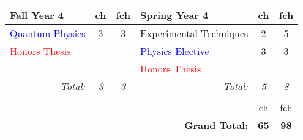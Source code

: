 \documentclass[12pt,preprint]{aastex}
\newcommand{\red}[1]{\textcolor{red}{#1}}
\newcommand{\blue}[1]{\textcolor{blue}{#1}}
\begin{document}
\begin{longtable}{lcclcc}
\hline
{\bf Fall Year 4} & {\sc ch} & {\sc fch} & {\bf Spring Year 4} & {\sc ch} & {\sc fch} \\ 
\hline
\hline
\blue{Quantum Physics} & 3 & 3 & Experimental Techniques  & 2 & 5 \\
\red{Honors Thesis}    &   &   & \blue{Physics Elective}  & 3 & 3 \\
                       &   &   & \red{Honors Thesis}  &  &  \\
\multicolumn{1}{r}{\emph{Total:}} & \emph{3} & \emph{3} &
\multicolumn{1}{r}{\emph{Total:}} & \emph{5}  & \emph{8} \\
\hline \\
 &   &   &  & {\sc ch} & {\sc fch} \\  
 &   &   & \multicolumn{1}{r}{{\bf Grand Total:}} & {\bf 65} & {\bf 98} \\  
\end{longtable}

\newpage
\end{document}
